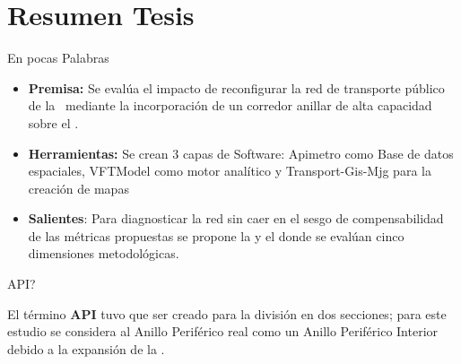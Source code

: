 %  
%  

\section{Resumen Tesis}
\begin{frame}{En pocas Palabras}
  \footnotesize
  \begin{itemize}
    \setlength{\itemsep}{0pt}
    \item \textbf{Premisa:} Se evalúa el impacto de reconfigurar la red de transporte público de la \zmvm\ mediante la incorporación de un corredor anillar de alta capacidad sobre el .
    \item \textbf{Herramientas:} Se crean 3 capas de Software: Apimetro como Base de datos espaciales, VFTModel como motor analítico y Transport-Gis-Mjg para la creación de mapas
    \item \textbf{Salientes}: Para diagnosticar la red sin caer en el sesgo de compensabilidad de las métricas propuestas se propone la  y el  donde se evalúan cinco dimensiones metodológicas.
  \end{itemize}

  \begin{block}{\textquestiondown{}API?}
    \footnotesize
    \raggedright
    El término \textbf{API} tuvo que ser creado para la división en dos secciones; para este estudio se considera al Anillo Periférico real como un Anillo Periférico Interior debido a la expansión de la \zmvm.
  \end{block}
\end{frame}
